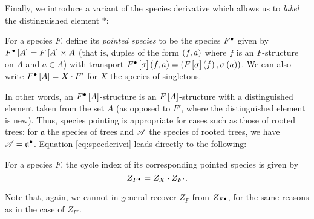 \documentclass[sectionflow,singlespace,twoside,boldmathhdr]{brandiss} %
\numberwithin{section}{chapter}
\numberwithin{figure}{chapter}
\begin{document}
Finally, we introduce a variant of the species derivative which allows us to \emph{label} the distinguished element $*$:
\begin{definition}
  \label{def:specpoint}
  For a species $F$, define its \emph{pointed species} to be the species ${F}^{\bullet }$ given by ${F}^{\bullet } \left[ {A} \right] = F \left[ {A} \right] \times A$ (that is, duples of the form $\left( {f, a} \right)$ where $f$ is an $F$-structure on $A$ and $a \in A$) with transport ${F}^{\bullet } \left[ {\sigma} \right] \left( {f, a} \right) = \left( {F \left[ {\sigma} \right] \left( {f} \right), \sigma \left( {a} \right)} \right)$.
  We can also write ${F}^{\bullet } \left[ {A} \right] = X \cdot F'$ for $X$ the species of singletons.
\end{definition}
In other words, an ${F}^{\bullet } \left[ {A} \right]$-structure is an $F \left[ {A} \right]$-structure with a distinguished element taken from the set $A$ (as opposed to $F'$, where the distinguished element is new).
Thus, species pointing is appropriate for cases such as those of rooted trees: for $\mathfrak{a}$ the species of trees and $\mathscr{A}$ the species of rooted trees, we have $\mathscr{A} = {\mathfrak{a}}^{\bullet }$.
Equation \eqref{eq:specderivci} leads directly to the following:
\begin{theorem}
  \label{thm:specpointci}
  For a species $F$, the cycle index of its corresponding pointed species is given by
  \begin{equation}
    \label{eq:specpointci}
    Z_{{F}^{\bullet }} = Z_{X} \cdot Z_{F'}.
  \end{equation}
\end{theorem}
Note that, again, we cannot in general recover $Z_{F}$ from $Z_{{F}^{\bullet }}$, for the same reasons as in the case of $Z_{F'}$.
\end{document}

